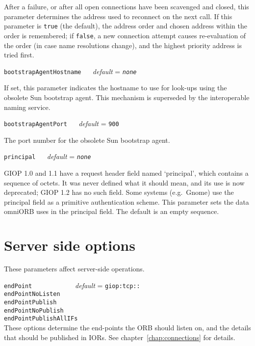 \documentclass[11pt,oneside,a4paper]{book}
\makeatletter
\newcommand{\code}[1]{\texttt{#1}}
\newcommand{\confopt}[2]
  {\vspace{\baselineskip}\par\noindent\code{#1} ~~ \textit{default} =
   \code{#2}}
\renewcommand{\confopt}[2]
  {\vspace{\baselineskip}\par\noindent\code{#1} ~~ \textit{default} =
   \code{#2}\\[-1ex]\@afterheading}
\makeatother
\begin{document}
After a failure, or after all open connections have been scavenged and
closed, this parameter determines the address used to reconnect on the
next call. If this parameter is \code{true} (the default), the address
order and chosen address within the order is remembered; if
\code{false}, a new connection attempt causes re-evaluation of the
order (in case name resolutions change), and the highest priority
address is tried first.

\confopt{bootstrapAgentHostname}{\textit{none}}

If set, this parameter indicates the hostname to use for look-ups
using the obsolete Sun bootstrap agent. This mechanism is superseded
by the interoperable naming service.


\confopt{bootstrapAgentPort}{900}

The port number for the obsolete Sun bootstrap agent.


\confopt{principal}{\textit{none}}

GIOP 1.0 and 1.1 have a request header field named `principal', which
contains a sequence of octets. It was never defined what it should
mean, and its use is now deprecated; GIOP 1.2 has no such field. Some
systems (e.g.\ Gnome) use the principal field as a primitive
authentication scheme. This parameter sets the data omniORB uses in
the principal field. The default is an empty sequence.



\section{Server side options}

These parameters affect server-side operations.


\vspace{\baselineskip}

\noindent
\code{endPoint~~~~~~~~~} ~~ \textit{default} = \code{giop:tcp::}\\
\code{endPointNoListen}\\
\code{endPointPublish}\\
\code{endPointNoPublish}\\
\code{endPointPublishAllIFs}\\[.1ex]

\noindent
These options determine the end-points the ORB should listen on, and
the details that should be published in IORs. See
chapter~\ref{chap:connections} for details.
\end{document}
